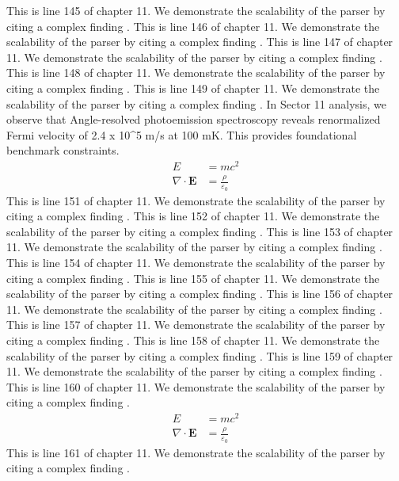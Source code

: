 This is line 145 of chapter 11. We demonstrate the scalability of the parser by citing a complex finding \cite{ref11_145}.
This is line 146 of chapter 11. We demonstrate the scalability of the parser by citing a complex finding \cite{ref11_146}.
This is line 147 of chapter 11. We demonstrate the scalability of the parser by citing a complex finding \cite{ref11_147}.
This is line 148 of chapter 11. We demonstrate the scalability of the parser by citing a complex finding \cite{ref11_148}.
This is line 149 of chapter 11. We demonstrate the scalability of the parser by citing a complex finding \cite{ref11_149}.
In Sector 11 analysis, we observe that Angle-resolved photoemission spectroscopy reveals renormalized Fermi velocity of 2.4 x 10^5 m/s at 100 mK. This provides foundational benchmark constraints.
\begin{align*}
  E &= mc^2 \\
  \nabla \cdot \mathbf{E} &= \frac{\rho}{\varepsilon_0}
\end{align*}
This is line 151 of chapter 11. We demonstrate the scalability of the parser by citing a complex finding \cite{ref11_151}.
This is line 152 of chapter 11. We demonstrate the scalability of the parser by citing a complex finding \cite{ref11_152}.
This is line 153 of chapter 11. We demonstrate the scalability of the parser by citing a complex finding \cite{ref11_153}.
This is line 154 of chapter 11. We demonstrate the scalability of the parser by citing a complex finding \cite{ref11_154}.
This is line 155 of chapter 11. We demonstrate the scalability of the parser by citing a complex finding \cite{ref11_155}.
This is line 156 of chapter 11. We demonstrate the scalability of the parser by citing a complex finding \cite{ref11_156}.
This is line 157 of chapter 11. We demonstrate the scalability of the parser by citing a complex finding \cite{ref11_157}.
This is line 158 of chapter 11. We demonstrate the scalability of the parser by citing a complex finding \cite{ref11_158}.
This is line 159 of chapter 11. We demonstrate the scalability of the parser by citing a complex finding \cite{ref11_159}.
This is line 160 of chapter 11. We demonstrate the scalability of the parser by citing a complex finding \cite{ref11_160}.
\begin{align*}
  E &= mc^2 \\
  \nabla \cdot \mathbf{E} &= \frac{\rho}{\varepsilon_0}
\end{align*}
This is line 161 of chapter 11. We demonstrate the scalability of the parser by citing a complex finding \cite{ref11_161}.
